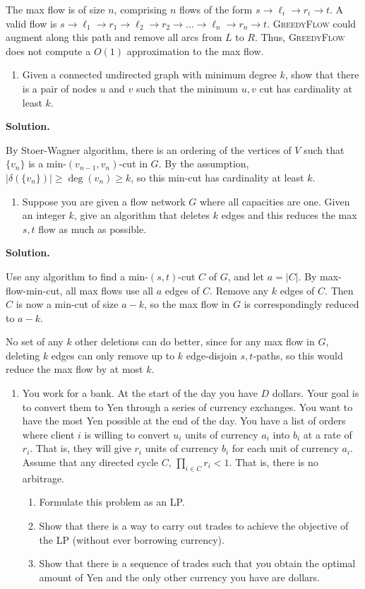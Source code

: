 \documentclass[11pt,letterpaper]{article}
\theoremstyle{definition}
\newcommand{\solution}{\medskip\noindent\textbf{Solution.}\par\medskip}
\begin{document}
The max flow is of size $n$, comprising $n$ flows of the form $s\rightarrow \ell_i\rightarrow r_i\rightarrow t$.
A valid flow is $s\rightarrow \ell_1\rightarrow r_1\rightarrow \ell_2\rightarrow r_2\rightarrow\dots \rightarrow \ell_n\rightarrow r_n\rightarrow t$.
\textsc{GreedyFlow} could augment along this path and remove all arcs from $L$ to $R$. 
Thus, \textsc{GreedyFlow} does not compute a $O(1)$ approximation to the max flow.


\begin{enumerate}[resume=q]
\item Given a connected undirected graph with minimum degree $k$, show that there is a pair of nodes $u$ and $v$ such that the minimum $u,v$ cut has cardinality at least $k$.
\end{enumerate}

\solution
By Stoer-Wagner algorithm, there is an ordering of the vertices of $V$ such that $\{v_n\}$ is a min-$(v_{n-1},v_n)$-cut in $G$.
By the assumption, $|\delta(\{v_n\})|\geq \deg(v_n)\geq k$, so this min-cut has cardinality at least $k$.


\begin{enumerate}[resume=q]
\item Suppose you are given a flow network $G$ where all capacities are one. Given an integer $k$, give an algorithm that deletes $k$ edges and this reduces the max $s,t$ flow as much as possible.
\end{enumerate}

\solution
Use any algorithm to find a min-$(s,t)$-cut $C$ of $G$, and let $a = |C|$. By max-flow-min-cut, all max flows use all $a$ edges of $C$.
Remove any $k$ edges of $C$. Then $C$ is now a min-cut of size $a-k$, so the max flow in $G$ is correspondingly reduced to $a-k$.

No set of any $k$ other deletions can do better, since for any max flow in $G$, deleting $k$ edges can only remove up to $k$ edge-disjoin $s,t$-paths, so this would reduce the max flow by at most $k$.


\begin{enumerate}[resume=q]
\item You work for a bank. At the start of the day you have $D$ dollars. Your goal is to convert them to Yen through a series of currency exchanges. You want to have the most Yen possible at the end of the day. You have a list of orders where client $i$ is willing to convert $u_i$ units of currency $a_i$ into $b_i$ at a rate of $r_i$. That is, they will give $r_i$ units of currency $b_i$ for each unit of currency $a_i$. Assume that any directed cycle $C$, $\prod_{i \in C} r_i < 1$. That is, there is no arbitrage.
\begin{enumerate}
\item Formulate this problem as an LP.
\item Show that there is a way to carry out trades to achieve the objective of the LP (without ever borrowing currency).
\item Show that there is a sequence of trades such that you obtain the optimal amount of Yen and the only other currency you have are dollars.
\end{enumerate}
\end{enumerate}
\end{document}
